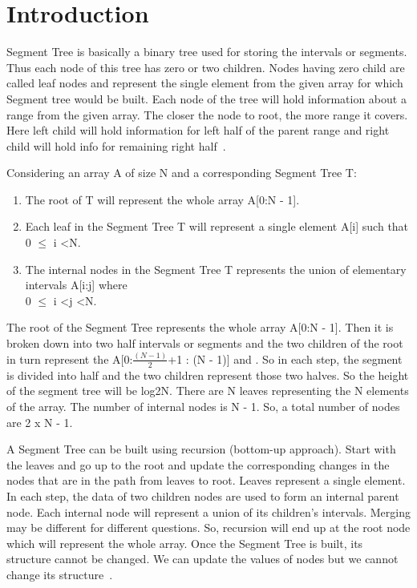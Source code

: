 \documentclass[conference,column]{IEEEtran}
\begin{document}
\section{Introduction}
Segment Tree is basically a binary tree used for storing the intervals or segments. Thus each node of this tree has zero or two children. Nodes having zero child are called leaf nodes and represent the single element from the given array for which Segment tree would be built. Each node of the tree will hold information about a range from the given array. The closer the node to root, the more range it covers. Here left child will hold information for left half of the parent range and right child will hold info for remaining right half~\cite{def}. 


Considering an array A of size N and a corresponding Segment Tree T:
\begin{enumerate}
\item The root of T will represent the whole array A[0:N - 1].
\item Each leaf in the Segment Tree T will represent a single element A[i] such that 0 $\leq$ i \textless N.
\item The internal nodes in the Segment Tree T represents the union of elementary intervals A[i:j] where\\ 0 $\leq$ i \textless j \textless N.
\end{enumerate}		


The root of the Segment Tree represents the whole array A[0:N - 1]. Then it is broken down into two half intervals or segments and the two children of the root in turn represent the A[0:$\frac{(N - 1)}{2}$+1 : (N - 1)] and . So in each step, the segment is divided into half and the two children represent those two halves. So the height of the segment tree will be log2N. There are N leaves representing the N elements of the array. The number of internal nodes is N - 1. So, a total number of nodes are 2 x N - 1. 


A Segment Tree can be built using recursion (bottom-up approach). Start with the leaves and go up to the root and update the corresponding changes in the nodes that are in the path from leaves to root. Leaves represent a single element. In each step, the data of two children nodes are used to form an internal parent node. Each internal node will represent a union of its children’s intervals. Merging may be different for different questions. So, recursion will end up at the root node which will represent the whole array. Once the Segment Tree is built, its structure cannot be changed. We can update the values of nodes but we cannot change its structure~\cite{type}.   
\end{document}
